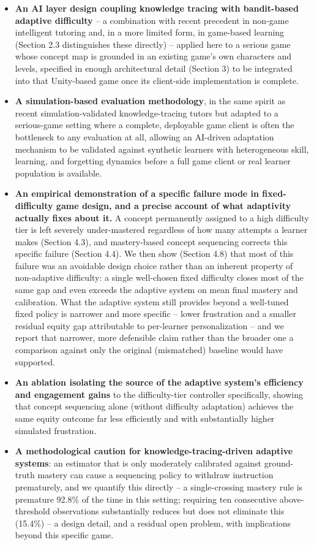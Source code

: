 \documentclass[11pt]{article}
\begin{document}
\begin{itemize}
\item \textbf{An AI layer design coupling knowledge tracing with bandit-based adaptive difficulty} -- a combination with recent precedent in non-game intelligent tutoring \cite{ref39} and, in a more limited form, in game-based learning \cite{ref40} (Section 2.3 distinguishes these directly) -- applied here to a serious game whose concept map is grounded in an existing game's own characters and levels, specified in enough architectural detail (Section 3) to be integrated into that Unity-based game once its client-side implementation is complete.
\item \textbf{A simulation-based evaluation methodology}, in the same spirit as recent simulation-validated knowledge-tracing tutors \cite{ref39} but adapted to a serious-game setting where a complete, deployable game client is often the bottleneck to any evaluation at all, allowing an AI-driven adaptation mechanism to be validated against synthetic learners with heterogeneous skill, learning, and forgetting dynamics before a full game client or real learner population is available.
\item \textbf{An empirical demonstration of a specific failure mode in fixed-difficulty game design, and a precise account of what adaptivity actually fixes about it.} A concept permanently assigned to a high difficulty tier is left severely under-mastered regardless of how many attempts a learner makes (Section 4.3), and mastery-based concept sequencing corrects this specific failure (Section 4.4). We then show (Section 4.8) that most of this failure was an avoidable design choice rather than an inherent property of non-adaptive difficulty: a single well-chosen fixed difficulty closes most of the same gap and even exceeds the adaptive system on mean final mastery and calibration. What the adaptive system still provides beyond a well-tuned fixed policy is narrower and more specific -- lower frustration and a smaller residual equity gap attributable to per-learner personalization -- and we report that narrower, more defensible claim rather than the broader one a comparison against only the original (mismatched) baseline would have supported.
\item \textbf{An ablation isolating the source of the adaptive system's efficiency and engagement gains} to the difficulty-tier controller specifically, showing that concept sequencing alone (without difficulty adaptation) achieves the same equity outcome far less efficiently and with substantially higher simulated frustration.
\item \textbf{A methodological caution for knowledge-tracing-driven adaptive systems}: an estimator that is only moderately calibrated against ground-truth mastery can cause a sequencing policy to withdraw instruction prematurely, and we quantify this directly -- a single-crossing mastery rule is premature 92.8\% of the time in this setting; requiring ten consecutive above-threshold observations substantially reduces but does not eliminate this (15.4\%) -- a design detail, and a residual open problem, with implications beyond this specific game.
\end{itemize}
\end{document}
